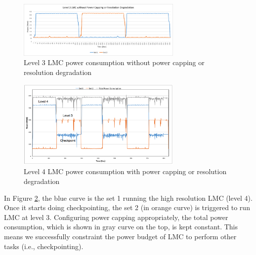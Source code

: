 \begin{figure}[H]
	\centering
    \includegraphics[width=8cm]{figs/lev3withoutpowercap.png}
        \caption{Level 3 LMC power consumption without power capping or resolution degradation}
        \label{fig:lev3withoutpowercap}
\end{figure}


\begin{figure}[H]
	\centering
    \includegraphics[width=8cm]{figs/LMCtradeoff.png}
        \caption{Level 4 LMC power consumption with power capping or resolution degradation}
        \label{fig:LMCtradeoff}
\end{figure}

In Figure \ref{fig:LMCtradeoff}, the blue curve is the set 1 running the high resolution LMC (level 4). Once it starts doing checkpointing, the set 2 (in orange curve) is triggered to run LMC at level 3. Configuring power capping appropriately, the total power consumption, which is shown in gray curve on the top, is kept constant. This means we successfully constraint the power budget of LMC to perform other tasks (i.e., checkpointing).
